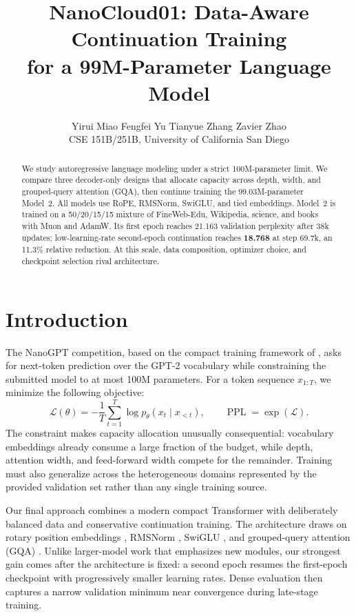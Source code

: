 \documentclass{article}
\title{NanoCloud01: Data-Aware Continuation Training\\
for a 99M-Parameter Language Model}
\author{
  Yirui Miao \quad Fengfei Yu \quad Tianyue Zhang \quad Zavier Zhao\\
  CSE 151B/251B, University of California San Diego
}
\newcommand{\ppl}{\operatorname{PPL}}
\begin{document}
\maketitle
\raggedbottom
\setlength{\parfillskip}{0pt plus 0.3\linewidth}

\begin{abstract}
We study autoregressive language modeling under a strict 100M-parameter
limit. We compare three decoder-only designs that allocate capacity across
depth, width, and grouped-query attention (GQA), then continue training the
99.03M-parameter Model~2. All models use RoPE, RMSNorm, SwiGLU, and tied
embeddings. Model~2 is trained on a 50/20/15/15 mixture of FineWeb-Edu,
Wikipedia, science, and books with Muon and AdamW. Its first epoch reaches
21.163 validation perplexity after 38k updates; low-learning-rate
second-epoch continuation reaches \textbf{18.768} at step 69.7k, an 11.3\%
relative reduction. At this scale, data composition, optimizer choice, and
checkpoint selection rival architecture.
\end{abstract}

\section{Introduction}

The NanoGPT competition, based on the compact training framework of
\citet{karpathy2022nanogpt}, asks for next-token prediction over the GPT-2
vocabulary while constraining the submitted model to at most 100M parameters.
For a token sequence $x_{1:T}$, we minimize the following objective:
\begin{equation}
  \mathcal{L}(\theta)
  =-\frac{1}{T}\sum_{t=1}^{T}
  \log p_\theta(x_t\mid x_{<t}),
  \qquad
  \ppl=\exp(\mathcal{L}).
  \label{eq:objective}
\end{equation}
The constraint makes capacity allocation unusually consequential: vocabulary
embeddings already consume a large fraction of the budget, while depth,
attention width, and feed-forward width compete for the remainder. Training
must also generalize across the heterogeneous domains represented by the
provided validation set rather than any single training source.

Our final approach combines a modern compact Transformer with deliberately
balanced data and conservative continuation training. The architecture draws
on rotary position embeddings \citep{su2021roformer}, RMSNorm
\citep{zhang2019root}, SwiGLU \citep{shazeer2020glu}, and grouped-query
attention (GQA) \citep{ainslie2023gqa}. Unlike larger-model work that emphasizes
new modules, our strongest gain comes after the architecture is fixed: a
second epoch resumes the first-epoch checkpoint with progressively smaller
learning rates. Dense evaluation then captures a narrow validation minimum
near convergence during late-stage training.
\end{document}

